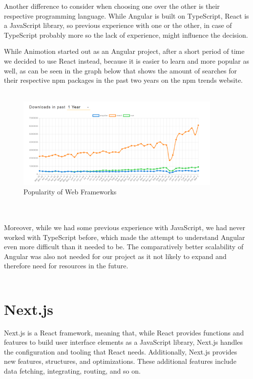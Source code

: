 Another difference to consider when choosing one over the other is their respective programming language. While Angular is built
on TypeScript, React is a JavaScript library, so previous experience with one or the other, in case of TypeScript probably
more so the lack of experience, might influence the decision. \cite{AngularReactComparison}

While Animotion started out as an Angular project, after a short period of time we decided to use React instead, because it 
is easier to learn and more popular as well, as can be seen in the graph below that shows the amount of searches for their 
respective npm packages in the past two years on the npm trends website. \cite{AngularReactPopularity}
\\
\\
\begin{figure}[htb]
  \centering
  \includegraphics[width=0.9\textwidth]{pics/webframeworkpop.png}
  \caption{Popularity of Web Frameworks}
  \label{fig:webpop}
\end{figure}
\\
\\
Moreover, while we had some previous experience with JavaScript, we had never worked with TypeScript before, which made the attempt 
to understand Angular even more difficult than it needed to be. The comparatively better scalability of Angular was also not needed
for our project as it not likely to expand and therefore need for resources in the future.
\\
\\
\section{Next.js}
Next.js is a React framework, meaning that, while React provides functions and features to build user interface elements
as a JavaScript library, Next.js handles the configuration and tooling that React needs. Additionally, Next.js provides
new features, structures, and optimizations. These additional features include data fetching, integrating, routing,
and so on. \cite{NextjsDescription}
\\
\\
